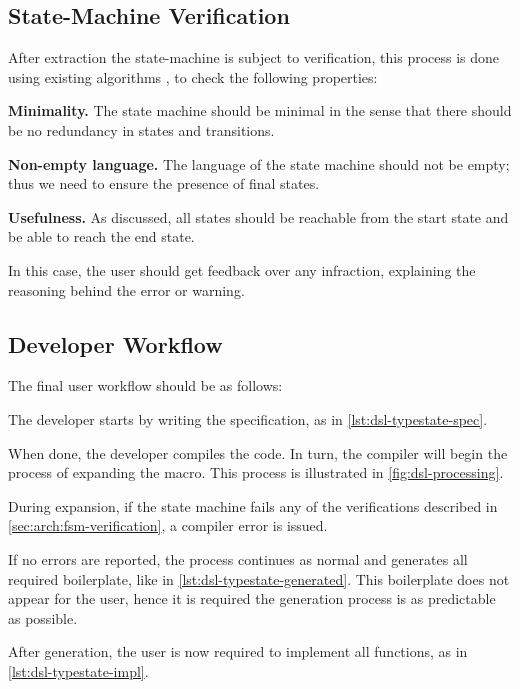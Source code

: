 \subsection{State-Machine Verification}\label{sec:arch:fsm-verification}
After extraction the state-machine is subject to verification,
this process is done using existing algorithms \autocite{Hopcroft2013}, to check the following properties:
\begin{compactitem}
    \item \textbf{Minimality.} The state machine should be minimal in the sense that there should be no redundancy in states and transitions.
    \item \textbf{Non-empty language.} The language of the state machine should not be empty; thus we need to ensure the presence of final states.
    \item \textbf{Usefulness.} As discussed, all states should be reachable from the start state and be able to reach the end state.
\end{compactitem}
In this case, the user should get feedback over any infraction,
explaining the reasoning behind the error or warning.

\subsection{Developer Workflow}
The final user workflow should be as follows:
\begin{compactenum}
    \item The developer starts by writing the specification, as in \autoref{lst:dsl-typestate-spec}.
    \item When done, the developer compiles the code.
    In turn, the compiler will begin the process of expanding the macro.
    This process is illustrated in \autoref{fig:dsl-processing}.
    \begin{compactitem}
        \item During expansion, if the state machine fails any of the verifications described in \autoref{sec:arch:fsm-verification},
        a compiler error is issued.
        \item If no errors are reported, the process continues as normal and generates all required boilerplate, like in \autoref{lst:dsl-typestate-generated}.
        This boilerplate does not appear for the user, hence it is required the generation process is as predictable as possible.
    \end{compactitem}
    \item After generation, the user is now required to implement all functions, as in \autoref{lst:dsl-typestate-impl}.
\end{compactenum}


